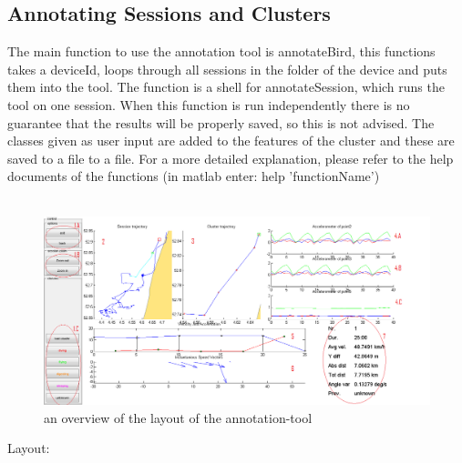 \documentclass[a4paper, 11pt]{article}
\begin{document}
\subsection{Annotating Sessions and Clusters}

The main function to use the annotation tool is annotateBird, this functions takes a deviceId, loops through all sessions in the folder of the device and puts them into the tool. The function is a shell for annotateSession, which runs the tool on one session. When this function is run independently there is no guarantee that the results will be properly saved, so this is not advised. The classes given as user input are added to the features of the cluster and these are saved to a file to a file. For a more detailed explanation, please refer to the help documents of the functions (in matlab enter: help 'functionName')\\ \\
\newpage
{
\begin{figure}[h]
\includegraphics[scale = 0.5]{tool_overview_indexed.png}
\caption{an overview of the layout of the annotation-tool}
\end{figure}
}
Layout:
\end{document}
